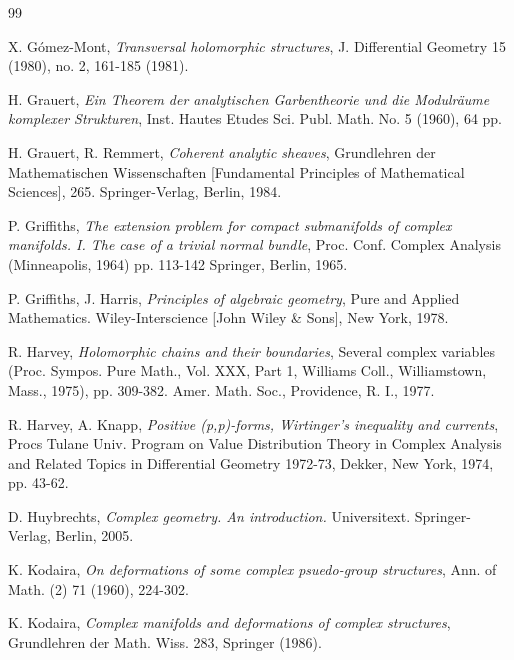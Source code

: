\documentclass[12pt]{amsart}
\numberwithin{equation}{section}
\theoremstyle{definition}
\theoremstyle{definition}
\theoremstyle{definition}
\renewcommand{\1}{\mathsf{1}}
\renewcommand{\>}{\rightarrow}
\theoremstyle{plain} %
\theoremstyle{plain} %
\theoremstyle{plain} %
\begin{document}
\begin{thebibliography}{99}
		
			X. G\'omez-Mont,
		\newblock\textit{Transversal holomorphic structures},
		\newblock J. Differential Geometry 15 (1980), no. 2, 161-185 (1981). 	
		
		H. Grauert,
		\newblock \textit{Ein Theorem der analytischen Garbentheorie und die Modulr\"aume komplexer Strukturen},
		\newblock
		Inst. Hautes Etudes Sci. Publ. Math. No. 5 (1960), 64 pp.
		
		
		 H. Grauert, R. Remmert,
		\textit{Coherent analytic sheaves},
		Grundlehren der Mathematischen Wissenschaften [Fundamental Principles of Mathematical Sciences], 265. Springer-Verlag, Berlin, 1984.	
		
		
		 P. Griffiths,
		\newblock \textit{The extension problem for compact submanifolds of complex manifolds.
			I. The case of a trivial normal bundle},
		\newblock Proc. Conf. Complex Analysis (Minneapolis, 1964) pp. 113-142 Springer,
		Berlin, 1965.
		
		 P. Griffiths, J. Harris,
		\newblock \textit{Principles of algebraic
			geometry},
		\newblock  Pure and Applied Mathematics. Wiley-Interscience [John
		Wiley \& Sons], New York, 1978.
		
		
		
		
		
		 R. Harvey,
		\newblock \textit{Holomorphic chains and their boundaries},
		\newblock  Several complex variables (Proc. Sympos. Pure Math., Vol. XXX, Part 1, Williams Coll., Williamstown, Mass., 1975), pp. 309-382. Amer. Math. Soc., Providence, R. I., 1977.
		
		 R. Harvey, A. Knapp,
		\newblock \textit{Positive (p,p)-forms, Wirtinger's inequality and currents},
		\newblock Procs Tulane Univ. Program on Value Distribution Theory in Complex Analysis and
		Related Topics in Differential Geometry 1972-73, Dekker, New York,
		1974, pp. 43-62.
		
		
		D. Huybrechts,
		\textit{Complex geometry. An introduction.}
		Universitext. Springer-Verlag, Berlin, 2005.
		
		
		K. Kodaira,
		\newblock \textit{On deformations of some complex psuedo-group structures},
		\newblock  Ann. of Math. (2) 71 (1960), 224-302.
		
		 K. Kodaira,
		\newblock \textit{Complex manifolds and deformations of complex
			structures},
		\newblock  Grundlehren der Math. Wiss. 283, Springer (1986).
		

\end{thebibliography}
\end{document}
